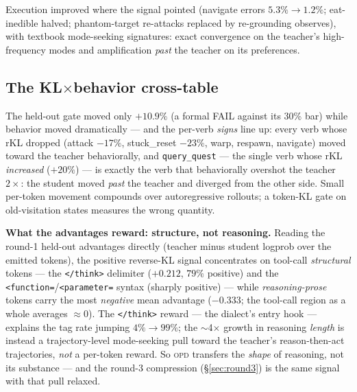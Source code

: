\documentclass[11pt]{article}
\newcommand{\opd}{\textsc{opd}}
\begin{document}
Execution improved where the signal pointed (navigate errors $5.3\%\!\rightarrow\!1.2\%$;
eat-inedible halved; phantom-target re-attacks replaced by re-grounding observes), with textbook
mode-seeking signatures: exact convergence on the teacher's high-frequency modes and
amplification \emph{past} the teacher on its preferences.

\subsection{The \texorpdfstring{KL$\times$behavior}{KL-times-behavior} cross-table}
\label{sec:crosstable}
The held-out gate moved only $+10.9\%$ (a formal FAIL against its 30\% bar) while behavior moved
dramatically --- and the per-verb \emph{signs} line up: every verb whose rKL dropped (attack
$-17\%$, stuck\_reset $-23\%$, warp, respawn, navigate) moved toward the teacher behaviorally,
and \texttt{query\_quest} --- the single verb whose rKL \emph{increased} ($+20\%$) --- is exactly
the verb that behaviorally overshot the teacher $2\times$: the student moved \emph{past} the
teacher and diverged from the other side. Small per-token movement compounds over autoregressive
rollouts; a token-KL gate on old-visitation states measures the wrong quantity.

\textbf{What the advantages reward: structure, not reasoning.} Reading the round-1 held-out
advantages directly (teacher minus student logprob over the emitted tokens), the positive
reverse-KL signal concentrates on tool-call \emph{structural} tokens --- the \texttt{</think>}
delimiter ($+0.212$, $79\%$ positive) and the \texttt{<function=}/\texttt{<parameter=} syntax
(sharply positive) --- while \emph{reasoning-prose} tokens carry the most \emph{negative} mean
advantage ($-0.333$; the tool-call region as a whole averages $\approx$0). The \texttt{</think>}
reward --- the dialect's entry hook --- explains the tag rate jumping $4\%\rightarrow99\%$; the
$\sim$4$\times$ growth in reasoning \emph{length} is instead a trajectory-level mode-seeking pull
toward the teacher's reason-then-act trajectories, \emph{not} a per-token reward. So \opd{} transfers
the \emph{shape} of reasoning, not its substance --- and the round-3 compression
(\S\ref{sec:round3}) is the same signal with that pull relaxed.
\end{document}
